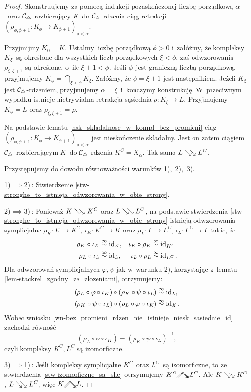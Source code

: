 \begin{proof}
Skonstruujemy za pomocą indukcji pozaskończonej liczbę porządkową $\alpha$~oraz $\mathcal{C}_\triangle$-rozbierający $K$~do $\mathcal{C}_\triangle$-rdzenia ciąg retrakcji $\left(\rho_{\phi,\phi+1}\colon K_\phi\to K_{\phi+1}\right)_{\phi<\alpha}$. 

Przyjmijmy $K_0=K$. Ustalmy liczbę porządkową $\phi>0$ i~załóżmy, że kompleksy $K_\xi$~są określone dla wszystkich liczb porządkowych $\xi<\phi$, zaś odwzorowania $\rho_{\xi,\xi+1}$ są określone, o~ile $\xi+1<\phi$. Jeśli $\phi$~jest graniczną liczbą porządkową, przyjmujemy $K_\phi=\bigcap_{\xi<\phi} K_\xi$. Załóżmy, że $\phi=\xi+1$ jest następnikiem. Jeżeli $K_\xi$ jest $\mathcal{C}_\triangle$-rdzeniem, przyjmujemy $\alpha=\xi$~i~kończymy konstrukcję. W~przeciwnym wypadku istnieje nietrywialna retrakcja sąsiednia $\rho\colon K_\xi\to L$. Przyjmujemy $K_\phi=L$ oraz $\rho_{\xi,\xi+1}=\rho$.

Na podstawie lematu \ref{nsk_skladalnosc_w_kompl_bez_promieni} ciąg $\left(\rho_{\phi,\phi+1}\colon K_\phi\to K_{\phi+1}\right)_{\phi<\alpha}$ jest nieskończenie składalny. Jest on zatem ciągiem $\mathcal{C}_\triangle$-rozbierającym $K$~do $\mathcal{C}_\triangle$-rdzenia $K^C=K_\alpha$. Tak samo $L\searrow\!\!\searrow L^C$.

Przystępujemy do dowodu równoważności warunków 1),~2),~3).

\mbox{1)$\implies$2)}\,: Stwierdzenie \ref{stw-stronghe_to_istnieja_odwzorowania_w_obie_strony}.

\mbox{2)$\implies$3)}\,: Ponieważ $K\searrow\!\!\searrow K^C$ oraz $L\searrow\!\!\searrow L^C$, na podstawie stwierdzenia \ref{stw-stronghe_to_istnieja_odwzorowania_w_obie_strony} istnieją odwzorowania symplicjalne $\rho_K\colon K\to K^C$, $\iota_K\colon K^C\to K$ oraz $\rho_L\colon L\to L^C$, $\iota_L\colon L^C\to L$ takie, że
\begin{align*}
\rho_K\circ \iota_K&\stackrel{\infty}{\sim} \operatorname{id}_K,&\iota_K\circ \rho_K&\stackrel{\infty}{\sim} \operatorname{id}_{K^C}\\
\rho_L\circ \iota_L&\stackrel{\infty}{\sim} \operatorname{id}_L,&\iota_L\circ \rho_L&\stackrel{\infty}{\sim} \operatorname{id}_{L^C}.
\end{align*}
Dla odwzorowań symplicjalnych $\varphi,\psi$ jak w~warunku 2), korzystając z~lematu \ref{lem-stackrel_zgodny_ze_zlozeniami}, otrzymujemy:
\begin{align*}(\rho_L\circ\varphi\circ\iota_K)\circ (\rho_K\circ\psi\circ\iota_L)&\stackrel{\infty}{\sim} \operatorname{id}_L,\\
(\rho_K\circ\psi\circ\iota_L)\circ (\rho_L\circ\varphi\circ\iota_K)&\stackrel{\infty}{\sim} \operatorname{id}_K.
\end{align*}
Wobec wniosku \ref{wn-bez_promieni_rdzen_nie_istnieje_niesk_sasiednie_id} zachodzi równość \[(\rho_L\circ\varphi\circ\iota_K)=(\rho_K\circ\psi\circ\iota_L)^{-1},\] czyli kompleksy $K^C, L^C$ są izomorficzne.

\mbox{3)$\implies$1)}\,: Jeśli kompleksy symplicjalne $K^C$~oraz $L^C$~są izomorficzne, to ze stwierdzenia \ref{stw-izomorficzne_sa_she} otrzymujemy $K^C\stronghe L^C$. Ale $K\searrow\!\!\searrow K^C$, $L\searrow\!\!\searrow L^C$, więc $K\stronghe L$.
\end{proof}

